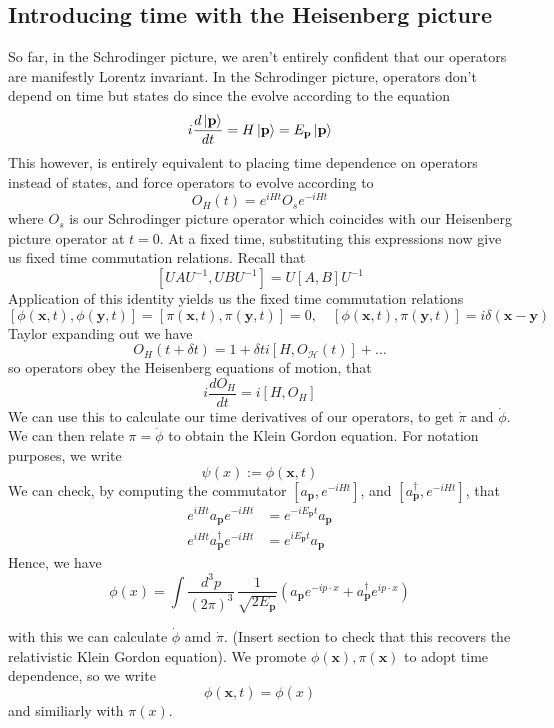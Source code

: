 \documentclass[11pt, oneside]{article}   	%
\theoremstyle{newline}
\theoremstyle{newline}
\theoremstyle{newline}
\theoremstyle{newline}
\theoremstyle{newline}
\newcommand{\intp}{ \int \frac{ d^3 p }{ (2 \pi)^3 } \, }
\newcommand{\ann}[1]{a_{ \mathbf{ #1 }}}
\newcommand{\crea}[1]{a^\dagger_{ \mathbf{ #1 }}}
\newcommand{\ve}[1]{ \mathbf{ #1 } }
\begin{document}
\subsection{Introducing time with the Heisenberg picture}
So far, in the Schrodinger picture, we aren't entirely confident that our operators are manifestly Lorentz invariant. In the Schrodinger picture, operators don't depend on time but states do since the evolve according to the equation 
\[	 
i \frac{ d \ket{ \ve{ p } } }{ dt }  = H \ket { \ve{ p} }  = E_\ve{ p } \ket{ \ve{ p } } 
\] This however, is entirely equivalent to placing time dependence on operators instead of states, and force operators to evolve according to 
\[ 	
O_H( t )  = e^{ i H t } O_s   e^{ - i H t } 
\] where $ O_s $ is our Schrodinger picture operator which coincides with our Heisenberg picture operator at $t = 0$. At a fixed time, substituting this expressions now give us fixed time commutation relations. Recall that 
\[ 	
[ U A U^{ - 1}, U BU^{ - 1} ] = U[ A , B ] U^{ -1 } 
\] Application of this identity yields us the fixed time commutation relations 
\[
[ \phi ( \ve { x} , t ), \phi( \ve{ y } , t ) ]  = [ \pi ( \ve{ x} , t ) , \pi ( \ve{ y}, t ) ] = 0, \quad  [ \phi( \ve{ x}, t ), \pi ( \ve{ y }, t ) ] = i \delta ( \ve{ x -y } ) 
\] 
Taylor expanding out we have 
\[
O_H(t + \delta t ) = 1 + \delta t i[H, O_\mathcal{H} ( t) ] + \dots
\]
so operators obey the Heisenberg equations of motion, that 
\[ 	
i \frac{ d O_H}{ dt }  = i [ H, O_H ] 
\] We can use this to calculate our time derivatives of our operators, to get $\dot{ \pi}$ and $\dot{ \phi } $. We can then relate $\pi = \dot{ \phi } $ to obtain the Klein Gordon equation. For notation purposes, we write 
\[ 
\psi ( x) := \phi( \ve{ x} , t ) \] 
We can check, by computing the commutator $[ a_\ve{ p }, e^{ -i H t } ] $, and $[ a_\ve{ p }^\dagger, e^{ -i H t } ] $, that 
\begin{align*} 
e^{i H t} a_\ve{ p } e^{ - iH t } &= e^{ - i E_\ve{ p} t } a_\ve{ p} \\
e^{i H t} a_\ve{ p }^\dagger  e^{ - iH t } &= e^{ i E_\ve{ p} t } a_\ve{ p} 
\end{align*}   Hence, we have 
\[
\phi ( x)  = \intp \frac{ 1 }{ \sqrt { 2 E_\ve{ p } } } (\ann{p}e^{ -i p \cdot x }  + \crea{ p } e^{ i p \cdot x } ) 
\] 


with this we can calculate $\dot{\phi}$ amd $\dot{\pi}$. (Insert section to check that this recovers the relativistic Klein Gordon equation). 
We promote $\phi(\mathbf{x}), \pi(\mathbf{x})$
to adopt time dependence, so we write 
\[
\phi(\mathbf{x}, t) = \phi(x) 
\] and similiarly with $\pi(x)$. 
\end{document}
